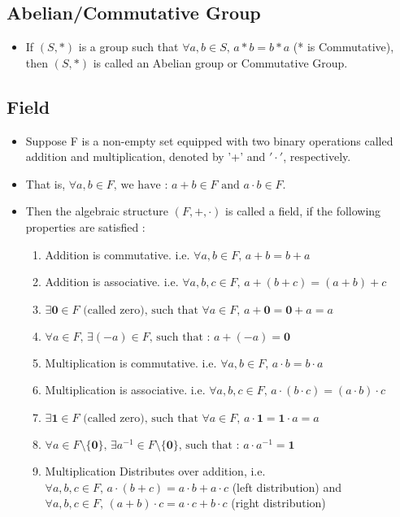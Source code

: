 \documentclass[twoside]{article}
\begin{document}
	\subsection{Abelian/Commutative Group}
	\begin{itemize}
		\item If $(S, *)$ is a group such that $\forall a, b \in S \text{, } a * b = b * a$ (* is Commutative), then $(S, *)$ is called an Abelian group or Commutative Group.
	\end{itemize}
	
	\subsection{Field}
	\begin{itemize}
		\item Suppose F is a non-empty set equipped with two binary operations called addition and multiplication, denoted by '+' and $'\cdot'$, respectively. 
		\item That is, $\forall a,b \in F \text{, we have : } a + b \in F \text{ and } a \cdot b \in F $.
		\item Then the algebraic structure $(F, +, \cdot)$ is called a field, if the following properties are satisfied : 
		\begin{enumerate}
			\item Addition is commutative. i.e. $\forall a,b \in F \text{, } a + b = b + a$
			\item Addition is associative. i.e. $\forall a,b,c \in F \text{, } a + (b + c) = (a + b) + c$
			\item $\exists \mathbf{0}\in F \text{ (called zero), such that } \forall a \in F \text{, } a + \mathbf{0} = \mathbf{0} + a = a$
			\item $\forall a \in F \text{, } \exists (-a) \in F \text{, such that : } a + (-a) = \mathbf{0}$
			\item Multiplication is commutative. i.e. $\forall a,b \in F \text{, } a \cdot b = b \cdot a$
			\item Multiplication is associative. i.e. $\forall a,b,c \in F \text{, } a \cdot (b \cdot  c) = (a \cdot b) \cdot c$
			\item $\exists \mathbf{1}\in F \text{ (called zero), such that } \forall a \in F \text{, } a \cdot \mathbf{1} = \mathbf{1} \cdot a = a$
			\item $\forall a \in F \setminus\{ \mathbf{0} \} \text{, } \exists a^{-1} \in F \setminus \{\mathbf{0}\} \text{, such that : } a \cdot a^{-1} = \mathbf{1}$
			\item Multiplication Distributes over addition, i.e. $\forall a,b,c \in F \text{, } a \cdot (b + c) = a \cdot b + a \cdot c $ (left distribution) and $\forall a,b,c \in F \text{, } (a + b) \cdot c = a \cdot c + b \cdot c$ (right distribution)

\end{enumerate}
\end{itemize}
\end{document}
